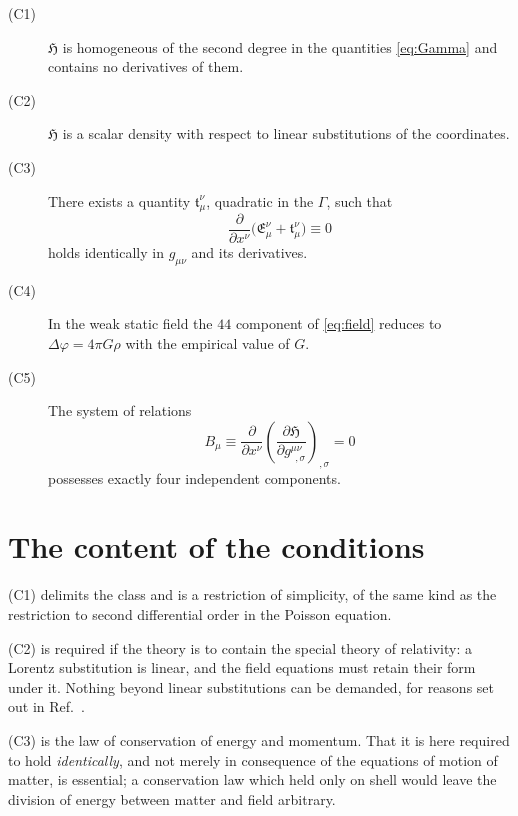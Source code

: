 \documentclass[aps,prd,reprint,amsmath,amssymb,nofootinbib,longbibliography]{revtex4-2}
\begin{document}
\begin{description}

\item[(C1)] $\mathfrak{H}$ is homogeneous of the second degree in the quantities \eqref{eq:Gamma}
and contains no derivatives of them.

\item[(C2)] $\mathfrak{H}$ is a scalar density with respect to linear substitutions of the
coordinates.

\item[(C3)] There exists a quantity $\mathfrak{t}^{\nu}_{\mu}$, quadratic in the
$\Gamma$, such that
\begin{equation}
\frac{\partial}{\partial x^{\nu}}
  \big( \mathfrak{E}^{\nu}_{\mu} + \mathfrak{t}^{\nu}_{\mu} \big) \equiv 0
\label{eq:C3}
\end{equation}
holds identically in $g_{\mu\nu}$ and its derivatives.

\item[(C4)] In the weak static field the $44$ component of \eqref{eq:field} reduces to
$\Delta \varphi = 4\pi G \rho$ with the empirical value of $G$.

\item[(C5)] The system of relations
\begin{equation}
B_{\mu} \equiv \frac{\partial}{\partial x^{\nu}}
   \left( \frac{\partial \mathfrak{H}}{\partial g^{\mu\nu}_{\ \ ,\sigma}} \right)_{,\sigma}
   = 0
\label{eq:C5}
\end{equation}
possesses exactly four independent components.

\end{description}

\section{The content of the conditions}
\label{sec:content}

(C1) delimits the class and is a restriction of simplicity, of the same kind as the restriction to
second differential order in the Poisson equation.

(C2) is required if the theory is to contain the special theory of relativity: a Lorentz
substitution is linear, and the field equations must retain their form under it. Nothing beyond
linear substitutions can be demanded, for reasons set out in Ref.~\cite{paperD}.

(C3) is the law of conservation of energy and momentum. That it is here required to hold
\emph{identically}, and not merely in consequence of the equations of motion of matter, is
essential; a conservation law which held only on shell would leave the division of energy between
matter and field arbitrary.
\end{document}
